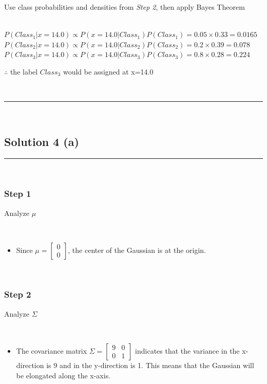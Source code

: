 \documentclass{article}
\begin{document}
\parbox{\textwidth}{Use class probabilities and densities from \textit{Step 2}, then apply Bayes Theorem}\\

$P(Class_1|x=14.0) \propto P(x=14.0|Class_1)P(Class_1) = 0.05 \times 0.33 = 0.0165$\\

$P(Class_2|x=14.0) \propto P(x=14.0|Class_2)P(Class_2) = 0.2 \times 0.39 = 0.078$\\

$P(Class_3|x=14.0) \propto P(x=14.0|Class_3)P(Class_3) = 0.8 \times 0.28 = 0.224$\\

\parbox{\textwidth}{$\therefore$ the label $Class_3$ would be assigned at x=14.0}\\

\noindent\rule{\textwidth}{0.4pt}\\

\newpage

\subsection*{Solution 4 (a)}
\noindent\rule{\textwidth}{0.4pt}\\
\subsubsection*{Step 1}
\parbox{\textwidth}{Analyze $\mu$}\\
\begin{itemize}
    \item \parbox{\textwidth}{Since $\mu = \begin{bmatrix} 0 \\ 0 \end{bmatrix}$, the center of the Gaussian is at the origin.}\\
\end{itemize}
\subsubsection*{Step 2}
\parbox{\textwidth}{Analyze $\Sigma$}\\
\begin{itemize}
    \item \parbox{\textwidth}{The covariance matrix $\Sigma = \begin{bmatrix} 9 & 0 \\ 0 & 1 \end{bmatrix}$ indicates that the variance in the x-direction is 9 and in the y-direction is 1. This means that the Gaussian will be elongated along the x-axis.}\\
\end{itemize}
\end{document}
